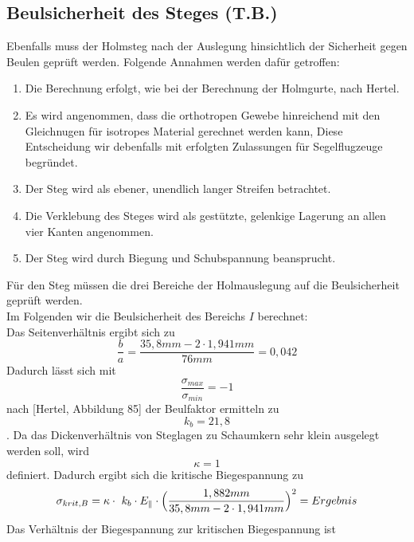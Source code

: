 \subsection{Beulsicherheit des Steges (T.B.)}
Ebenfalls muss der Holmsteg nach der Auslegung hinsichtlich der Sicherheit gegen Beulen geprüft werden. Folgende Annahmen werden dafür getroffen:\\
\begin{enumerate}
	\item Die Berechnung erfolgt, wie bei der Berechnung der Holmgurte, nach Hertel.
	\item Es wird angenommen, dass die orthotropen Gewebe hinreichend mit den Gleichnugen für isotropes Material gerechnet werden kann, Diese Entscheidung wir debenfalls mit erfolgten Zulassungen für Segelflugzeuge begründet.
	\item Der Steg wird als ebener, unendlich langer Streifen betrachtet.
	\item Die Verklebung des Steges wird als gestützte, gelenkige Lagerung an allen vier Kanten angenommen.
	\item Der Steg wird durch Biegung und Schubspannung beansprucht.
\end{enumerate}
Für den Steg müssen die drei Bereiche der Holmauslegung auf die Beulsicherheit geprüft werden. \\
\noindent Im Folgenden wir die Beulsicherheit des Bereichs $I$ berechnet:\\
\noindent Das Seitenverhältnis ergibt sich zu 
\begin{equation}
	\frac{b}{a}=\frac{35,8 mm-2\cdot 1,941 mm}{76 mm}=0,042
\end{equation}
Dadurch lässt sich mit 
\begin{equation}
	\frac{\sigma_{max}}{\sigma_{min}}=-1
\end{equation}
nach [Hertel, Abbildung 85] der Beulfaktor ermitteln zu
\begin{equation}
	k_{b} = 21,8
\end{equation}.
Da das Dickenverhältnis von Steglagen zu Schaumkern sehr klein ausgelegt werden soll, wird
\begin{equation}
	\kappa = 1
\end{equation}
definiert. Dadurch ergibt sich die kritische Biegespannung zu
\begin{equation}
	\sigma_{krit,B}=\kappa\cdot\ k_{b}\cdot E_{\parallel}\cdot\Bigl(\frac{1,882 mm}{35,8 mm-2\cdot 1,941 mm}\Bigr)^{2}=Ergebnis
\end{equation}
Das Verhältnis der Biegespannung zur kritischen Biegespannung ist
